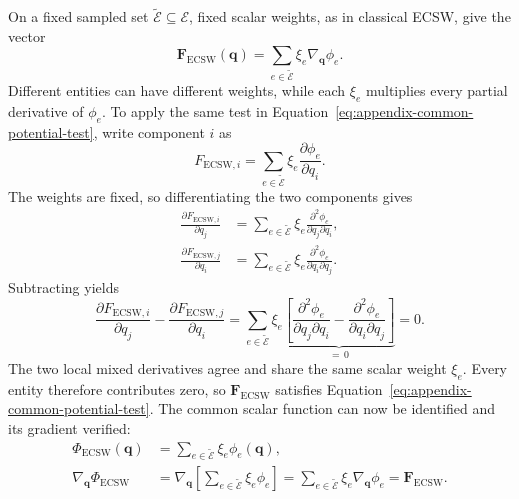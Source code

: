 \documentclass[a4paper,12pt]{article}
\newcommand{\vect}[1]{\boldsymbol{#1}}
\begin{document}
On a fixed sampled set $\widetilde{\mathcal E}\subseteq\mathcal E$, fixed scalar weights, as in classical ECSW, give the vector
\[
 \vect{F}_{\mathrm{ECSW}}(\vect{q})
 =\sum_{e\in\widetilde{\mathcal E}}\xi_e\nabla_{\vect{q}}\phi_e.
\]
Different entities can have different weights, while each $\xi_e$ multiplies every partial derivative of $\phi_e$. To apply the same test in Equation~\eqref{eq:appendix-common-potential-test}, write component $i$ as
\[
 F_{\mathrm{ECSW},i}
 =\sum_{e\in\widetilde{\mathcal E}}\xi_e\frac{\partial \phi_e}{\partial q_i}.
\]
The weights are fixed, so differentiating the two components gives
\[
 \begin{aligned}
 \frac{\partial F_{\mathrm{ECSW},i}}{\partial q_j}
 &=\sum_{e\in\widetilde{\mathcal E}}\xi_e
       \frac{\partial^2\phi_e}{\partial q_j\partial q_i},\\
 \frac{\partial F_{\mathrm{ECSW},j}}{\partial q_i}
 &=\sum_{e\in\widetilde{\mathcal E}}\xi_e
       \frac{\partial^2\phi_e}{\partial q_i\partial q_j}.
 \end{aligned}
\]
Subtracting yields
\[
 \frac{\partial F_{\mathrm{ECSW},i}}{\partial q_j}
 -\frac{\partial F_{\mathrm{ECSW},j}}{\partial q_i}
 =\sum_{e\in\widetilde{\mathcal E}}\xi_e
   \underbrace{\left[
    \frac{\partial^2\phi_e}{\partial q_j\partial q_i}
    -\frac{\partial^2\phi_e}{\partial q_i\partial q_j}
   \right]}_{=\,0}
 =0.
\]
The two local mixed derivatives agree and share the same scalar weight $\xi_e$. Every entity therefore contributes zero, so $\vect{F}_{\mathrm{ECSW}}$ satisfies Equation~\eqref{eq:appendix-common-potential-test}. The common scalar function can now be identified and its gradient verified:
\begin{equation}
 \begin{aligned}
 \Phi_{\mathrm{ECSW}}(\vect{q})
 &=\sum_{e\in\widetilde{\mathcal E}}\xi_e \phi_e(\vect{q}),\\
 \nabla_{\vect{q}}\Phi_{\mathrm{ECSW}}
 &=\nabla_{\vect{q}}\left[\sum_{e\in\widetilde{\mathcal E}}\xi_e \phi_e\right]
 =\sum_{e\in\widetilde{\mathcal E}}\xi_e\nabla_{\vect{q}}\phi_e
 =\vect{F}_{\mathrm{ECSW}}.
 \end{aligned}
 \label{eq:appendix-scalar-weighted-gradient}
\end{equation}
\end{document}
